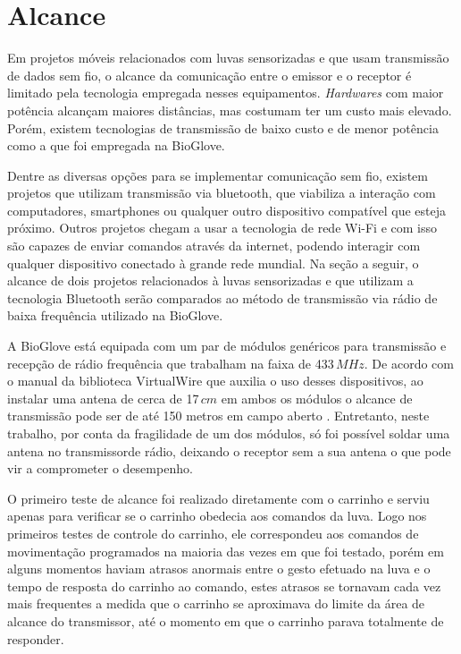 \documentclass[
	12pt,				%
	openright,			%
	oneside,			%
	a4paper,			%
	english,			%
	brazil				%
	]{abntex2}
\begin{document}
			\section{Alcance}

		Em projetos móveis relacionados com luvas sensorizadas e que usam transmissão de dados sem fio, o alcance da comunicação entre o emissor e o receptor é limitado pela tecnologia empregada nesses equipamentos. \textit{Hardwares} com maior potência alcançam maiores distâncias, mas costumam ter um custo mais elevado. Porém, existem tecnologias de transmissão de baixo custo e de menor potência como a que foi empregada na BioGlove. 
			
		Dentre as diversas opções para se implementar comunicação sem fio, existem projetos que utilizam transmissão via bluetooth, que viabiliza a interação com computadores, smartphones ou qualquer outro dispositivo compatível que esteja próximo. Outros projetos chegam a usar a tecnologia de rede Wi-Fi e com isso são capazes de enviar comandos através da internet, podendo interagir com qualquer dispositivo conectado à grande rede mundial. Na seção a seguir, o alcance de dois projetos relacionados à luvas sensorizadas e que utilizam a tecnologia Bluetooth serão comparados ao método de transmissão via rádio de baixa frequência utilizado na BioGlove.

		A BioGlove está equipada com um par de módulos genéricos para transmissão e recepção de rádio frequência que trabalham na faixa de 433$\,MHz$. De acordo com o manual da biblioteca VirtualWire que auxilia o uso desses dispositivos, ao instalar uma antena de cerca de 17$\,cm$ em ambos os módulos o alcance de transmissão pode ser de até 150 metros em campo aberto \cite{virtualwiremanual}. Entretanto, neste trabalho, por conta da fragilidade de um dos módulos, só foi possível soldar uma antena no transmissorde rádio, deixando o receptor sem a sua antena o que pode vir a comprometer o desempenho.

		O primeiro teste de alcance foi realizado diretamente com o carrinho e serviu apenas para verificar se o carrinho obedecia aos comandos da luva. Logo nos primeiros testes de controle do carrinho, ele correspondeu aos comandos de movimentação programados na maioria das vezes em que foi testado, porém em alguns momentos haviam atrasos anormais entre o gesto efetuado na luva e o tempo de resposta do carrinho ao comando, estes atrasos se tornavam cada vez mais frequentes a medida que o carrinho se aproximava do limite da área de alcance do transmissor, até o momento em que o carrinho parava totalmente de responder.
\end{document}
